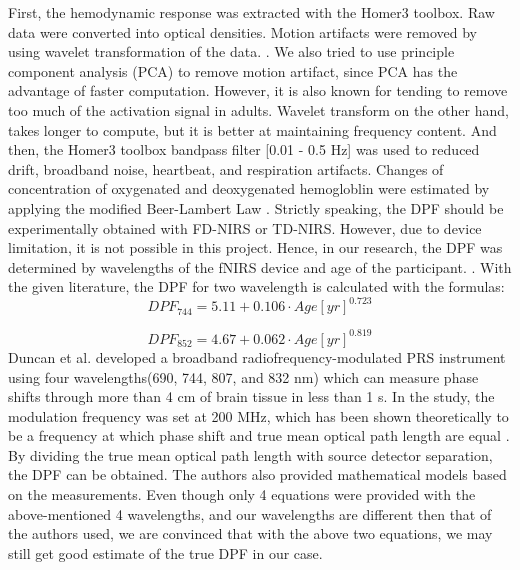 First, the hemodynamic response was extracted with the Homer3 toolbox. Raw data were converted into optical densities. Motion artifacts were removed by using wavelet transformation of the data. \cite {Molavi_2012}. We also tried to use principle component analysis (PCA) to remove motion artifact, since PCA has the advantage of faster computation. However, it is also known for tending to remove too much of the activation signal in adults. Wavelet transform on the other hand, takes longer to compute, but it is better at maintaining frequency content. And then, the Homer3 toolbox bandpass filter [0.01 - 0.5 Hz] was used to reduced drift, broadband noise, heartbeat, and respiration artifacts. Changes of concentration of oxygenated and deoxygenated hemogloblin were estimated by applying the modified Beer-Lambert Law  \cite {Delpy_1988}. Strictly speaking, the DPF should be experimentally obtained with FD-NIRS or TD-NIRS. However, due to device limitation, it is not possible in this project. Hence, in our research, the DPF was determined by wavelengths of the fNIRS device and age of the participant. \cite {Duncan1996MeasurementOC}. With the given literature, the DPF for two wavelength is calculated with the formulas:
\[
DPF_{744} = 5.11 + 0.106 \cdot Age[yr]^{0.723}
\]

\[
DPF_{852} = 4.67 + 0.062 \cdot Age[yr]^{0.819}
\]
Duncan et al. developed a broadband radiofrequency-modulated PRS instrument using four wavelengths(690, 744, 807, and 832 nm) which can measure phase shifts through more than 4 cm of brain tissue in less than 1 s. In the study, the modulation frequency was set at 200 MHz, which has been shown theoretically to be a frequency at which phase shift and true mean optical path length are equal \cite {Arridge_1992}. By dividing the true mean optical path length with source detector  separation, the DPF can be obtained. The authors also provided mathematical models based on the measurements. Even though only 4 equations were provided with the above-mentioned 4 wavelengths, and our wavelengths are different then that of the authors used, we are convinced that with the above two equations, we may still get good estimate of the true DPF in our case.

